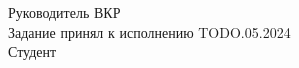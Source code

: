 Руководитель ВКР \hspace{3.5cm} \underline{\hspace{5cm}} \hfill \Supervisor\\[0.5cm]
Задание принял к исполнению TODO.05.2024\\[0.5cm]
Студент \hspace{5.8cm} \underline{\hspace{5cm}} \hfill \Author\\

